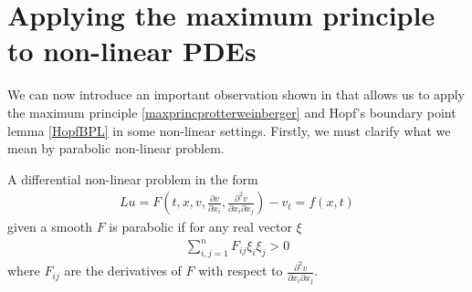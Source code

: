 \section{Applying the maximum principle to non-linear PDEs}
\label{non linear pde parabolic section}
We can now introduce an important observation shown in \cite{protterweinberger} that allows us to apply the maximum principle \ref{maxprincprotterweinberger} and Hopf's boundary point lemma \ref{HopfBPL} in some non-linear settings.  Firstly, we must clarify what we mean by parabolic non-linear problem. 
\begin{defin}\label{nonlinearpde}
	A differential non-linear problem in the form 
	\begin{align}
		Lu= F\left(t, x, v, \frac{\partial v}{\partial x_i} , \frac{\partial^2 v}{\partial x_i \partial x_j}\right)-v_t = f(x, t)\label{nonlinearexample}
	\end{align} 
	given a smooth $F$ is parabolic if for any real vector $\xi$
	\begin{align*}
		\sum_{i, j=1}^n F_{ij}\xi_i\xi_j >0
	\end{align*} 
	where $F_{ij}$ are the derivatives of $F$ with respect to $\frac{\partial^2 v}{\partial x_i \partial x_j}$. 
\end{defin}

